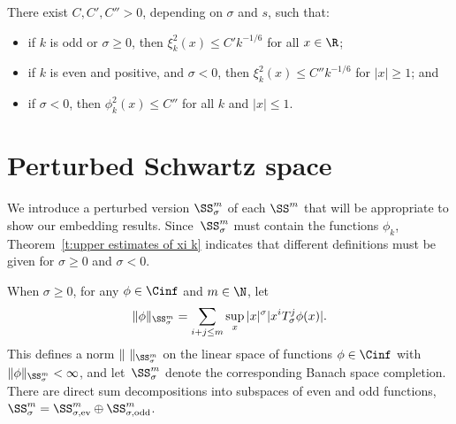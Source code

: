   \begin{Theorem}\label{t:upper estimates of xi k}
  There exist $C,C',C''>0$, depending on $\sigma$ and $s$, such that:
    \begin{itemize}\itemsep=0pt

      \item[$(i)$] if $k$ is odd or $\sigma\ge0$, then $\xi_k^2(x)\le C'k^{-1/6}$ for all $x\in\R$;

      \item[$(ii)$] if $k$ is even and positive, and $\sigma<0$, then $\xi_k^2(x)\le C''k^{-1/6}$ for $|x|\ge 1$; and

      \item[$(iii)$] if $\sigma<0$, then $\phi_k^2(x)\le C''$ for all $k$ and $|x|\le1$.

    \end{itemize}
\end{Theorem}



\section{Perturbed Schwartz space}\label{s:SS sigma}

We introduce a perturbed version $\SS_\sigma^m$ of each $\SS^m$ that will be appropriate to show our embedding results. Since~$\SS_\sigma^m$ must contain the functions $\phi_k$, Theorem~\ref{t:upper estimates of xi k} indicates that dif\/ferent def\/initions must be given for $\sigma\ge0$ and $\sigma<0$.

When $\sigma\ge0$, for any $\phi\in\Cinf$ and $m\in\N$, let
  \begin{gather}\label{SS_sigma^m, sigma ge0}
    \|\phi\|_{\SS_\sigma^m}=\sum_{i+j\le m}\sup_x|x|^\sigma |x^iT_\sigma^j\phi(x)| .
  \end{gather}
This def\/ines a norm $\|\ \|_{\SS_\sigma^m}$ on the linear space of
functions $\phi\in\Cinf$ with $\|\phi\|_{\SS_\sigma^m}<\infty$,
and let~$\SS_\sigma^m$ denote the corresponding Banach space
completion. There are direct sum decompositions into
subspaces of even and odd functions, $\SS_\sigma^m=\SS_{\sigma,\text{\rm ev}}^m\oplus\SS_{\sigma,\text{\rm odd}}^m$.

